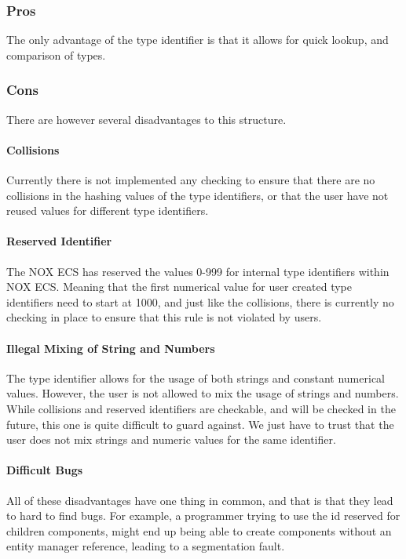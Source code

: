 \subsubsection{Pros}
The only advantage of the type identifier is that it allows for quick lookup,
and comparison of types.

\subsubsection{Cons}
There are however several disadvantages to this structure.

\paragraph{Collisions}
Currently there is not implemented any checking to ensure that there are no
collisions in the hashing values of the type identifiers, or that the user
have not reused values for different type identifiers.

\paragraph{Reserved Identifier}
The NOX ECS has reserved the values 0-999 for internal type identifiers within
NOX ECS. Meaning that the first numerical value for user created type identifiers
need to start at 1000, and just like the collisions, there is currently no checking
in place to ensure that this rule is not violated by users.

\paragraph{Illegal Mixing of String and Numbers}
The type identifier allows for the usage of both strings and constant numerical values.
However, the user is not allowed to mix the usage of strings and numbers.
While collisions and reserved identifiers are checkable, and will be checked in the future,
this one is quite difficult to guard against. We just have to trust that the user does not
mix strings and numeric values for the same identifier.

\paragraph{Difficult Bugs}
All of these disadvantages have one thing in common, and that is that they lead to
hard to find bugs. For example, a programmer trying to use the id reserved for
children components, might end up being able to create components without an entity manager
reference, leading to a segmentation fault.
